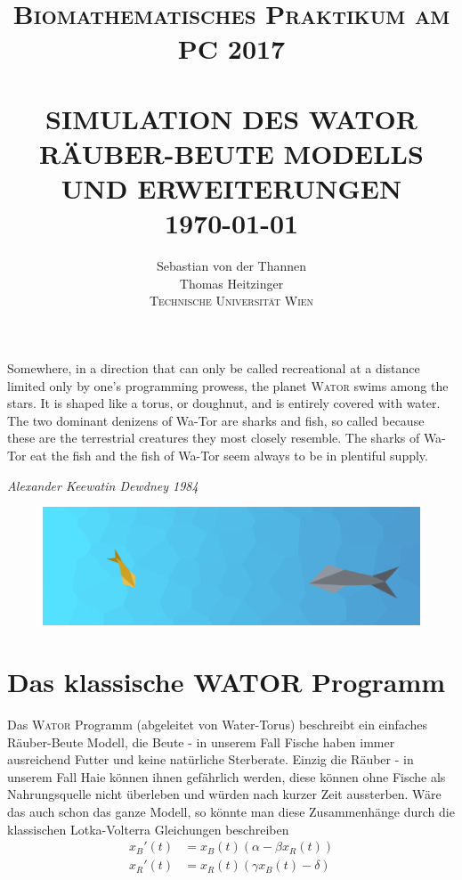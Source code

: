 \documentclass[a4paper,11pt]{article}
\title{ \normalsize \textsc{Biomathematisches Praktikum am PC 2017}    %
            \\[3.0cm]                   %
            \HRule{1pt} \\ [0.5cm]      %
            \LARGE \textbf{\uppercase{Simulation des WATOR Räuber-Beute Modells und Erweiterungen}}    %
            \HRule{1pt} \\ [0.5cm]      %
            \normalsize \today          %
        }
\author{
	        Sebastian von der Thannen\\
	        Thomas Heitzinger\\
	        \vspace{10mm}
	        \textsc{Technische Universität Wien}\\
	}
\makeatletter
\newcommand{\wator}{\textsc{Wator }}
\theoremstyle{definition}
\numberwithin{equation}{section}
\def\printtitle{%
    {\centering \@title\par}}
\def\printauthor{%
    {\centering \large \@author}}
\makeatother
\begin{document}
	\thispagestyle{empty}       %

	\printtitle                 %
	\vfill
	\printauthor                %
	\newpage
	
	
	\epigraph{
		Somewhere, in a direction that can only be called recreational at a distance limited only by one's programming prowess, the planet \wator swims among the stars. It is shaped like a torus, or doughnut, and is entirely covered with water. The two dominant denizens of Wa-Tor are sharks and fish, so called because these are the terrestrial creatures they most closely resemble. The sharks of Wa-Tor eat the fish and the fish of Wa-Tor seem always to be in plentiful supply.
	}{\textit{Alexander Keewatin Dewdney 1984}}

	\begin{figure}[H]
		\centering
		\includegraphics[width=1\textwidth]{pictures/encounter.png}
		\label{fig:encounter}
	\end{figure}

	\section{Das klassische WATOR Programm}

	Das \wator Programm (abgeleitet von Water-Torus) beschreibt ein einfaches Räuber-Beute Modell, die Beute - in unserem Fall Fische haben immer ausreichend Futter und keine natürliche Sterberate. Einzig die Räuber - in unserem Fall Haie können ihnen gefährlich werden, diese können ohne Fische als Nahrungsquelle nicht überleben und würden nach kurzer Zeit aussterben. Wäre das auch schon das ganze Modell, so könnte man diese Zusammenhänge durch die klassischen Lotka-Volterra Gleichungen beschreiben
	\begin{align} \label{eq:lotka_volterra}
		x_B'(t) &= x_B(t) \left(\alpha - \beta x_R(t)\right) \\
		x_R'(t) &= x_R(t) \left(\gamma x_B(t) - \delta\right) \nonumber
	\end{align}
\end{document}
